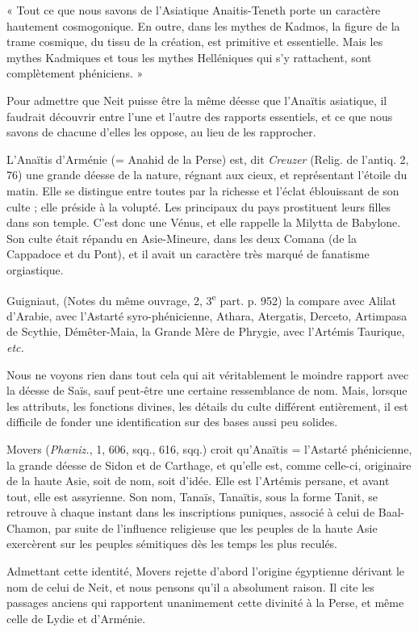 \documentclass[letterpaper,twocolumn,openany,nodeprecatedcode]{dndbook}
\begin{document}
« Tout ce que nous savons de l'Asiatique Anaitis-Teneth porte un caractère hautement cosmogonique. En outre, dans les mythes de Kadmos, la figure de la trame cosmique, du tissu de la création, est primitive et essentielle. Mais les mythes Kadmiques et tous les mythes Helléniques qui s'y rattachent, sont complètement phéniciens. »

Pour admettre que Neit puisse être la même déesse que l'Anaïtis asiatique, il faudrait découvrir entre l'une et l'autre des rapports essentiels, et ce que nous savons de chacune d'elles les oppose, au lieu de les rapprocher.

L'Anaïtis d'Arménie (= Anahid de la Perse) est, dit \emph{Creuzer} (Relig. de l'antiq. 2, 76) une grande déesse de la nature, régnant aux cieux, et représentant l'étoile du matin. Elle se distingue entre toutes par la richesse et l'éclat éblouissant de son culte ; elle préside à la volupté. Les principaux du pays prostituent leurs filles dans son temple. C'est donc une Vénus, et elle rappelle la Milytta de Babylone. Son culte était répandu en Asie-Mineure, dans les deux Comana (de la Cappadoce et du Pont), et il avait un caractère très marqué de fanatisme orgiastique.

Guigniaut, (Notes du même ouvrage, 2, 3\textsuperscript{e} part. p. 952) la compare avec Alilat d'Arabie, avec l'Astarté syro-phénicienne, Athara, Atergatis, Derceto, Artimpasa de Scythie, Démêter-Maia, la Grande Mère de Phrygie, avec l'Artémis Taurique, \emph{etc.}

Nous ne voyons rien dans tout cela qui ait véritablement le moindre rapport avec la déesse de Saïs, sauf peut-être une certaine ressemblance de nom. Mais, lorsque les attributs, les fonctions divines, les détails du culte différent entièrement, il est difficile de fonder une identification sur des bases aussi peu solides.

Movers (\emph{Phœniz.}, 1, 606, sqq., 616, sqq.) croit qu'Anaïtis = l'Astarté phénicienne, la grande déesse de Sidon et de Carthage, et qu'elle est, comme celle-ci, originaire de la haute Asie, soit de nom, soit d'idée. Elle est l'Artémis persane, et avant tout, elle est assyrienne. Son nom, Tanaïs, Tanaïtis, sous la forme Tanit, se retrouve à chaque instant dans les inscriptions puniques, associé à celui de Baal-Chamon, par suite de l'influence religieuse que les peuples de la haute Asie exercèrent sur les peuples sémitiques dès les temps les plus reculés.

Admettant cette identité, Movers rejette d'abord l'origine égyptienne dérivant le nom de celui de Neit, et nous pensons qu'il a absolument raison. Il cite les passages anciens qui rapportent unanimement cette divinité à la Perse, et même celle de Lydie et d'Arménie.
\end{document}
